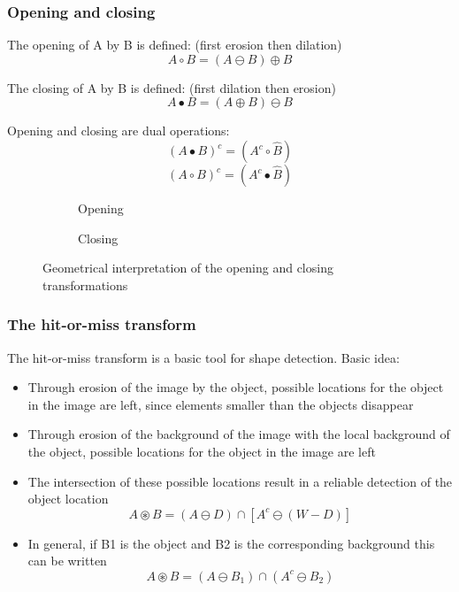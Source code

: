 \subsubsection{Opening and closing}
The opening of A by B is defined: (first erosion then dilation)
\[
	A \circ B = (A \ominus B) \oplus B
\]

The closing of A by B is defined: (first dilation then erosion)
\[
	A  \bullet B = (A \oplus B) \ominus B
\]

Opening and closing are dual operations: 
\[
	(A  \bullet B)^c = (A^c \circ \hat{B})
\]
\[
	(A \circ B)^c = (A^c \bullet \hat{B})
\]

\begin{figure}
	\centering
	\begin{subfigure}[b]{0.45\textwidth}
		\centering
		\caption{Opening}
	\end{subfigure}
	\begin{subfigure}[b]{0.45\textwidth}
		\centering
		\caption{Closing}
	\end{subfigure}
	\caption{Geometrical interpretation of the opening and closing transformations}
\end{figure}


\subsubsection{The hit-or-miss transform}
The hit-or-miss transform is a basic tool for shape detection. Basic idea:
\begin{itemize}
	\item Through erosion of the image by the object, possible locations for the object in the image are left, since elements smaller than the objects disappear
	
	\item Through erosion of the background of the image with the local background of the object, possible locations for the object in the image are left
	
	\item The intersection of these possible locations result in a reliable  detection of the object location
	\[
		A \circledast B = (A \ominus D) \cap [ A^c \ominus (W-D)]
	\]
	
	\item In general, if B1 is the object and B2 is the corresponding background this can be written
	\[
		A \circledast B = (A \ominus B_1)\cap (A^c \ominus B_2)	
	\]	
\end{itemize}

